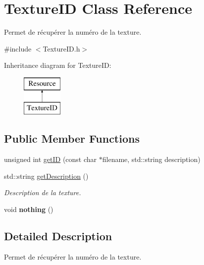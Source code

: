 \hypertarget{class_texture_i_d}{}\section{Texture\+I\+D Class Reference}
\label{class_texture_i_d}


Permet de récupérer la numéro de la texture.  




{\ttfamily \#include $<$Texture\+I\+D.\+h$>$}

Inheritance diagram for Texture\+I\+D\+:\begin{figure}[H]
\begin{center}
\leavevmode
\includegraphics[height=2.000000cm]{class_texture_i_d}
\end{center}
\end{figure}
\subsection*{Public Member Functions}
\begin{DoxyCompactItemize}
\item 
unsigned int \hyperlink{class_texture_i_d_a1f2f3ba0e4cf28553aee0cdd24a7ad81}{get\+I\+D} (const char $\ast$filename, std\+::string description)
\item 
\hypertarget{class_texture_i_d_a2dd547e81aac90d460ea9e9242e82396}{}std\+::string \hyperlink{class_texture_i_d_a2dd547e81aac90d460ea9e9242e82396}{get\+Description} ()\label{class_texture_i_d_a2dd547e81aac90d460ea9e9242e82396}

\begin{DoxyCompactList}\small\item\em Description de la texture. \end{DoxyCompactList}\item 
\hypertarget{class_texture_i_d_a864b5e596461705f446a570e585aba38}{}void {\bfseries nothing} ()\label{class_texture_i_d_a864b5e596461705f446a570e585aba38}

\end{DoxyCompactItemize}


\subsection{Detailed Description}
Permet de récupérer la numéro de la texture. 


